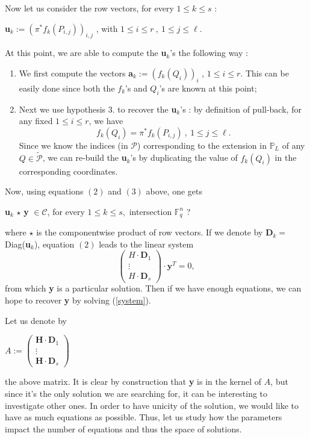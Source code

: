 \documentclass[10pt]{article}
\newcommand{\s}{\vspace{0.3cm}}
\newcommand{\cd}{\cdot}
\newcommand{\PP}{\mathbb{P}}
\newcommand{\fq}{\mathbb{F}_q}
\newcommand{\PR}{\mathcal{P}}
\begin{document}
Now let us consider the row vectors, for every $1 \leq k \leq s$ :
\begin{center}
\textbf{u}$_{k}:= \left(\pi^*f_k(P_{i,j})\right)_{i,j}$ , with $1 \leq i \leq r \ , \ 1 \leq j \leq \ell$.
\end{center}

At this point, we are able to compute the \textbf{u}$_{k}$'s the following way :
\begin{enumerate}
\item We first compute the vectors \textbf{a}$_{k} := (f_k(Q_i))_i$ , $1 \leq i \leq r$. This can be easily done since both the $f_k$'s and $Q_i$'s are known at this point;
\item Next we use hypothesis $3.$ to recover the \textbf{u}$_{k}$'s : by definition of pull-back, for any fixed $1 \leq i \leq r$, we have 
\[f_k(Q_i) = \pi^*f_k(P_{i,j}) \ , \ 1 \leq j \leq \ell.\]
Since we know the indices (in $\PR$) corresponding to the extension in $\PP_L$ of any $Q \in \tilde{\PR}$, we can re-build the \textbf{u}$_{k}$'s by duplicating the value of $f_k(Q_i)$ in the corresponding coordinates.
\end{enumerate}

Now, using equations $(2)$ and $(3)$ above, one gets 
\begin{center}
\textbf{u}$_{k}$ $\star$ \textbf{y} $\in \mathcal{C}$, for every $1 \leq k \leq s,$ \color{red} intersection $\fq^n$ ? \color{black}
\end{center}
where $\star$ is the componentwise product of row vectors.
If we denote by \textbf{D}$_{k} = $ Diag(\textbf{u}$_{k}$), equation $(2)$ leads to the linear system 
\begin{equation} \label{system}
\begin{pmatrix}
H \cd \textbf{D}_1 \\
\vdots \\
H \cd \textbf{D}_s
\end{pmatrix}
\cd \textbf{y}^T = 0, 
\end{equation}
from which \textbf{y} is a particular solution.
Then if we have enough equations, we can hope to recover \textbf{y} by solving (\ref{system}). 

\s

 Let us denote by
\begin{center}
$A := \begin{pmatrix}
\mathbf{H} \cd \mathbf{D}_1 \\
\vdots \\
\mathbf{H} \cd \mathbf{D}_s
\end{pmatrix}
$
\end{center}
the above matrix. It is clear by construction that \textbf{y} is in the kernel of $A$, but since it's the only solution we are searching for, it can be interesting to investigate other ones. In order to have unicity of the solution, we would like to have as much equations as possible. Thus, let us study how the parameters impact the number of equations and thus the space of solutions.
\end{document}
